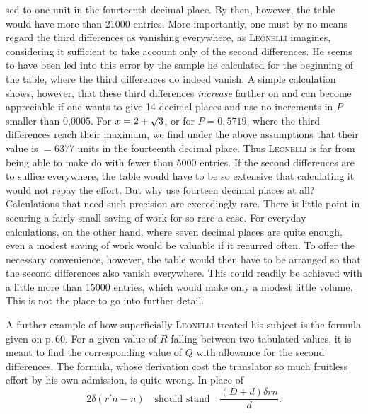 sed to one unit in the fourteenth decimal place. By then, however, the table would have more than 21000 entries. More importantly, one must by no means regard the third differences as vanishing everywhere, as \textsc{Leonelli} imagines, considering it sufficient to take account only of the second differences. He seems to have been led into this error by the sample he calculated for the beginning of the table, where the third differences do indeed vanish. A simple calculation shows, however, that these third differences \emph{increase} farther on and can become appreciable if one wants to give 14 decimal places and use no increments in $P$ smaller than 0,0005. For $x = 2+\mathord{\surd}3$, or for $P = 0,5719$, where the third differences reach their maximum, we find under the above assumptions that their value is $= 6377$ units in the fourteenth decimal place. Thus \textsc{Leonelli} is far from being able to make do with fewer than 5000 entries. If the second differences are to suffice everywhere, the table would have to be so extensive that calculating it would not repay the effort. But why use fourteen decimal places at all? Calculations that need such precision are exceedingly rare. There is little point in securing a fairly small saving of work for so rare a case. For everyday calculations, on the other hand, where seven decimal places are quite enough, even a modest saving of work would be valuable if it recurred often. To offer the necessary convenience, however, the table would then have to be arranged so that the second differences also vanish everywhere. This could readily be achieved with a little more than 15000 entries, which would make only a modest little volume. This is not the place to go into further detail.

A further example of how superficially \textsc{Leonelli} treated his subject is the formula given on p.\,60. For a given value of $R$ falling between two tabulated values, it is meant to find the corresponding value of $Q$ with allowance for the second differences. The formula, whose derivation cost the translator so much fruitless effort by his own admission, is quite wrong. In place of
\[
2\delta(r'n - n) \quad \text{should stand} \quad \frac{(D+d)\delta rn}{d}.
\]
